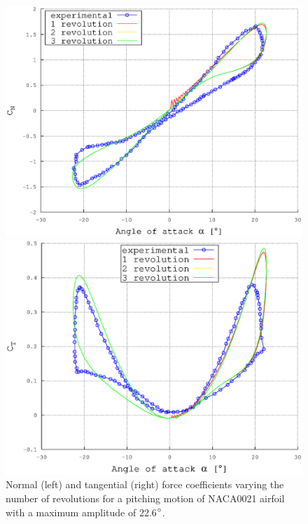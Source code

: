 \documentclass[a4paper]{jpconf}
\begin{document}
\begin{figure}[h]
\begin{minipage}{18pc}
\includegraphics[width=\columnwidth]{CN226revolutions.eps}
\end{minipage}\hspace{2pc}%
\begin{minipage}{18pc}
\includegraphics[width=\columnwidth]{CT226revolutions.eps}
\end{minipage} 
\caption{\label{revolutions}Normal (left) and tangential (right) force coefficients varying the number of revolutions for a pitching motion of NACA0021 airfoil with a maximum amplitude of 22.6$\degree$.}
\end{figure}
\end{document}
